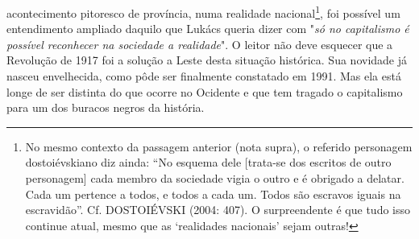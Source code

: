 acontecimento pitoresco de província, numa realidade nacional\footnote{No
  mesmo contexto da passagem anterior (nota supra), o referido
  personagem dostoiévskiano diz ainda: ``No esquema dele {[}trata-se dos
  escritos de outro personagem{]} cada membro da sociedade vigia o outro
  e é obrigado a delatar. Cada um pertence a todos, e todos a cada um.
  Todos são escravos iguais na escravidão''. Cf. DOSTOIÉVSKI (2004:
  407). O surpreendente é que tudo isso continue atual, mesmo que as
  `realidades nacionais' sejam outras!}, foi possível um entendimento
ampliado daquilo que Lukács queria dizer com "\emph{só no capitalismo é
possível reconhecer na sociedade a realidade}". O leitor não deve
esquecer que a Revolução de 1917 foi a solução a Leste desta situação
histórica. Sua novidade já nasceu envelhecida, como pôde ser finalmente
constatado em 1991. Mas ela está longe de ser distinta do que ocorre no
Ocidente e que tem tragado o capitalismo para um dos buracos negros da
história.

